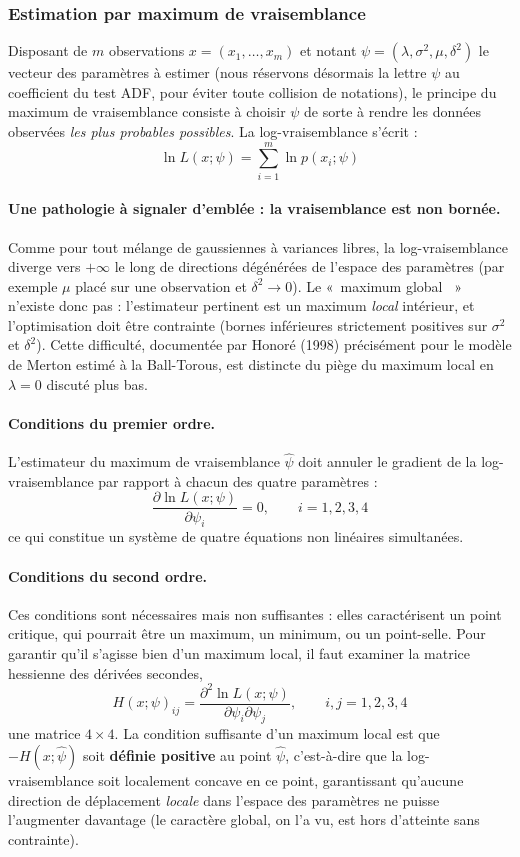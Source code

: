 \documentclass{article}
\providecommand{\og}{«~}
\providecommand{\fg}{~»}
\begin{document}
\subsubsection*{Estimation par maximum de vraisemblance}
Disposant de $m$ observations $x=(x_1,\dots,x_m)$ et notant $\psi=(\lambda,\sigma^2,\mu,\delta^2)$ le vecteur des paramètres à estimer (nous réservons désormais la lettre $\psi$ au coefficient du test ADF, pour éviter toute collision de notations), le principe du maximum de vraisemblance consiste à choisir $\psi$ de sorte à rendre les données observées \emph{les plus probables possibles}. La log-vraisemblance s'écrit :
\begin{equation}
\ln L(x;\psi) = \sum_{i=1}^{m} \ln p(x_i;\psi)
\end{equation}
\paragraph{Une pathologie à signaler d'emblée : la vraisemblance est non bornée.} Comme pour tout mélange de gaussiennes à variances libres, la log-vraisemblance diverge vers $+\infty$ le long de directions dégénérées de l'espace des paramètres (par exemple $\mu$ placé sur une observation et $\delta^2\to 0$). Le \og maximum global \fg{} n'existe donc pas : l'estimateur pertinent est un maximum \emph{local} intérieur, et l'optimisation doit être contrainte (bornes inférieures strictement positives sur $\sigma^2$ et $\delta^2$). Cette difficulté, documentée par Honoré (1998) précisément pour le modèle de Merton estimé à la Ball-Torous, est distincte du piège du maximum local en $\lambda=0$ discuté plus bas.
\paragraph{Conditions du premier ordre.} L'estimateur du maximum de vraisemblance $\hat{\psi}$ doit annuler le gradient de la log-vraisemblance par rapport à chacun des quatre paramètres :
\begin{equation}
\frac{\partial \ln L(x;\psi)}{\partial\psi_i} = 0, \qquad i=1,2,3,4
\end{equation}
ce qui constitue un système de quatre équations non linéaires simultanées.
\paragraph{Conditions du second ordre.} Ces conditions sont nécessaires mais non suffisantes : elles caractérisent un point critique, qui pourrait être un maximum, un minimum, ou un point-selle. Pour garantir qu'il s'agisse bien d'un maximum local, il faut examiner la matrice hessienne des dérivées secondes,
\begin{equation}
H(x;\psi)_{ij} = \frac{\partial^2 \ln L(x;\psi)}{\partial\psi_i \partial \psi_j}, \qquad i,j=1,2,3,4
\end{equation}
une matrice $4\times 4$. La condition suffisante d'un maximum local est que $-H(x;\hat{\psi})$ soit \textbf{définie positive} au point $\hat{\psi}$, c'est-à-dire que la log-vraisemblance soit localement concave en ce point, garantissant qu'aucune direction de déplacement \emph{locale} dans l'espace des paramètres ne puisse l'augmenter davantage (le caractère global, on l'a vu, est hors d'atteinte sans contrainte).
\end{document}
